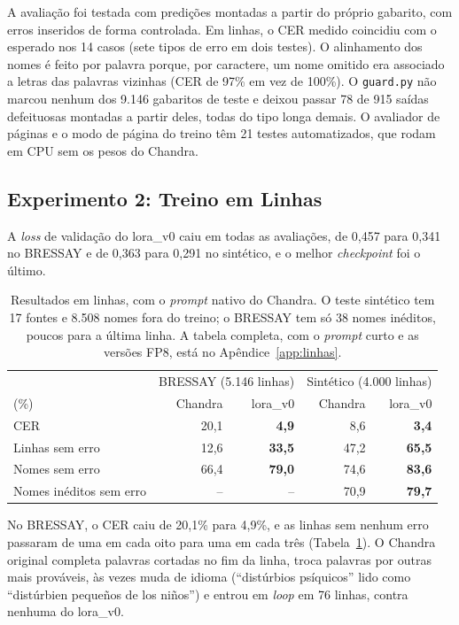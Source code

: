A avaliação foi testada com predições montadas a partir do próprio gabarito, com erros inseridos de forma controlada. Em linhas, o CER medido coincidiu com o esperado nos 14 casos (sete tipos de erro em dois testes). O alinhamento dos nomes é feito por palavra porque, por caractere, um nome omitido era associado a letras das palavras vizinhas (CER de 97\% em vez de 100\%). O \texttt{guard.py} não marcou nenhum dos 9.146 gabaritos de teste e deixou passar 78 de 915 saídas defeituosas montadas a partir deles, todas do tipo longa demais. O avaliador de páginas e o modo de página do treino têm 21 testes automatizados, que rodam em CPU sem os pesos do Chandra.

\subsection{Experimento 2: Treino em Linhas}
\label{subsec:exp2}

A \emph{loss} de validação do lora\_v0 caiu em todas as avaliações, de 0,457 para 0,341 no BRESSAY e de 0,363 para 0,291 no sintético, e o melhor \emph{checkpoint} foi o último.

\begin{table}[H]
\centering
\small
\begin{tabular}{@{}lrrrr@{}}
\toprule
& \multicolumn{2}{c}{BRESSAY (5.146 linhas)} & \multicolumn{2}{c}{Sintético (4.000 linhas)} \\
(\%) & Chandra & lora\_v0 & Chandra & lora\_v0 \\
\midrule
CER & 20,1 & \textbf{4,9} & 8,6 & \textbf{3,4} \\
Linhas sem erro & 12,6 & \textbf{33,5} & 47,2 & \textbf{65,5} \\
Nomes sem erro & 66,4 & \textbf{79,0} & 74,6 & \textbf{83,6} \\
Nomes inéditos sem erro & -- & -- & 70,9 & \textbf{79,7} \\
\bottomrule
\end{tabular}
\caption{Resultados em linhas, com o \emph{prompt} nativo do Chandra. O teste sintético tem 17 fontes e 8.508 nomes fora do treino; o BRESSAY tem só 38 nomes inéditos, poucos para a última linha. A tabela completa, com o \emph{prompt} curto e as versões FP8, está no Apêndice~\ref{app:linhas}.}
\label{tab:linhas}
\end{table}

No BRESSAY, o CER caiu de 20,1\% para 4,9\%, e as linhas sem nenhum erro passaram de uma em cada oito para uma em cada três (Tabela~\ref{tab:linhas}). O Chandra original completa palavras cortadas no fim da linha, troca palavras por outras mais prováveis, às vezes muda de idioma (``distúrbios psíquicos'' lido como ``distúrbien pequeños de los niños'') e entrou em \emph{loop} em 76 linhas, contra nenhuma do lora\_v0.

